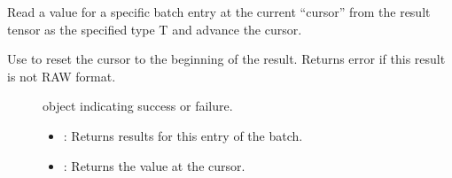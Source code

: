 \documentclass[letterpaper,10pt,english]{sphinxmanual}
\begin{document}
\begin{fulllineitems}
\begin{fulllineitems}
\begin{fulllineitems}
\label{\detokenize{cpp_api/classnvidia_1_1inferenceserver_1_1client_1_1InferContext:_CPPv4N6nvidia15inferenceserver6client12InferContext6Result14GetRawAtCursorE6size_tP1T}}%
\pysigstartmultiline
{}\label{\detokenize{cpp_api/classnvidia_1_1inferenceserver_1_1client_1_1InferContext:classnvidia_1_1inferenceserver_1_1client_1_1InferContext_1_1Result_1a64d951fd64068b9d2e3da103f47390fe}}%
\pysigstopmultiline
Read a value for a specific batch entry at the current “cursor” from the result tensor as the specified type T and advance the cursor. 

Use {\hyperref[\detokenize{cpp_api/classnvidia_1_1inferenceserver_1_1client_1_1InferContext_1_1Result:classnvidia_1_1inferenceserver_1_1client_1_1InferContext_1_1Result_1adb27437d415b569a3a4b7700c56002bf}]{}} to reset the cursor to the beginning of the result. Returns error if this result is not RAW format. \begin{description}
\item[{}] \leavevmode
{\hyperref[\detokenize{cpp_api/classnvidia_1_1inferenceserver_1_1client_1_1Error:classnvidia_1_1inferenceserver_1_1client_1_1Error}]{}} object indicating success or failure. 

\item[{}] \leavevmode\begin{itemize}
\item {} 
: Returns results for this entry of the batch. 

\item {} 
: Returns the value at the cursor. 

\end{itemize}

\end{description}


\end{fulllineitems}


\end{fulllineitems}
\end{fulllineitems}
\end{document}
